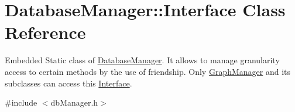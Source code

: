 \hypertarget{class_database_manager_1_1_interface}{}\section{Database\+Manager\+:\+:Interface Class Reference}
\label{class_database_manager_1_1_interface}


Embedded Static class of \hyperlink{class_database_manager}{Database\+Manager}. It allows to manage granularity access to certain methods by the use of friendship. Only \hyperlink{class_graph_manager}{Graph\+Manager} and its subclasses can access this \hyperlink{class_database_manager_1_1_interface}{Interface}.  




{\ttfamily \#include $<$db\+Manager.\+h$>$}


